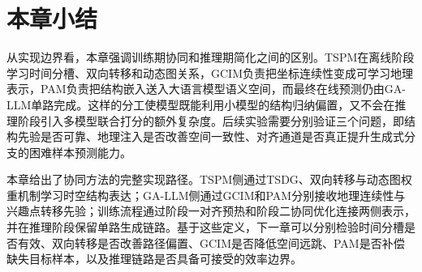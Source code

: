 \section{本章小结}
从实现边界看，本章强调训练期协同和推理期简化之间的区别。TSPM在离线阶段学习时间分槽、双向转移和动态图关系，GCIM负责把坐标连续性变成可学习地理表示，PAM负责把结构嵌入送入大语言模型语义空间，而最终在线预测仍由GA-LLM单路完成。这样的分工使模型既能利用小模型的结构归纳偏置，又不会在推理阶段引入多模型联合打分的额外复杂度。后续实验需要分别验证三个问题，即结构先验是否可靠、地理注入是否改善空间一致性、对齐通道是否真正提升生成式分支的困难样本预测能力。

本章给出了协同方法的完整实现路径。TSPM侧通过TSDG、双向转移与动态图权重机制学习时空结构表达；GA-LLM侧通过GCIM和PAM分别接收地理连续性与兴趣点转移先验；训练流程通过阶段一对齐预热和阶段二协同优化连接两侧表示，并在推理阶段保留单路生成链路。基于这些定义，下一章可以分别检验时间分槽是否有效、双向转移是否改善路径偏置、GCIM是否降低空间远跳、PAM是否补偿缺失目标样本，以及推理链路是否具备可接受的效率边界。
